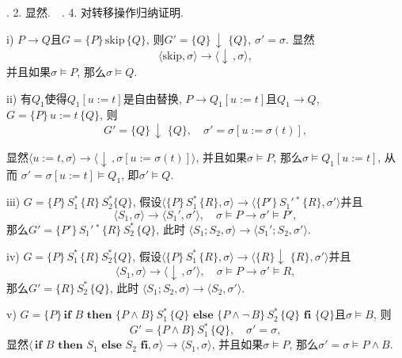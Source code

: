 \documentclass[UTF8]{ctexart}
\begin{document}

\hspace{-0.71em} {. 2.} 显然. \,\, {. 4.} 对转移操作归纳证明.

\hspace{0.5em} i) $P\to Q$且$G=\{P\}\,\mathrm{skip}\,\{Q\}$,
则$G'=\{Q\}\,\downarrow\,\,\{Q\}$, $\sigma'=\sigma$. 显然
\[
    \langle\mathrm{skip},\sigma\rangle\to
    \langle\downarrow\,,\sigma\rangle,
\]
并且如果$\sigma\models P$, 那么$\sigma\models Q$.

\hspace{0.5em} ii) 有$Q_1$使得$Q_1[u:=t]$是自由替换,
$P\to Q_1[u:=t]$且$Q_1\to Q$, $G=\{P\}\,u:=t\,\{Q\}$, 则
\[
    G'=\{Q\}\,\downarrow\,\,\{Q\},\quad\sigma'=\sigma[u:=\sigma(t)],
\]

显然$\langle u:=t,\sigma\rangle\to
\langle\downarrow\,,\sigma[u:=\sigma(t)]\rangle$,
并且如果$\sigma\models P$, 那么$\sigma\models Q_1[u:=t]$, 从而
$\sigma'=\sigma[u:=t]\models Q_1$, 即$\sigma'\models Q$.

\vspace{1pt}
\hspace{0.5em} iii) $G=\{P\}\,S_1^*\,\{R\}\,S_2^*\{Q\}$,
假设$\langle\{P\}\,S_1^*\,\{R\},\sigma\rangle\to
\langle\{P'\}\,S_1'\,^*\,\{R\},\sigma'\rangle$并且
\[
    \langle S_1,\sigma\rangle\to\langle S_1',\sigma'\rangle,\quad
    \sigma\models P\to\sigma'\models P',
\]
那么$G'=\{P'\}\,S_1'\,^*\,\{R\}\,S_2^*\,\{Q\}$, 此时
$\langle S_1;S_2,\sigma\rangle\to\langle S_1';S_2,\sigma'\rangle$.

\hspace{0.5em} iv) $G=\{P\}\,S_1^*\,\{R\}\,S_2^*\{Q\}$,
假设$\langle\{P\}\,S_1^*\,\{R\},\sigma\rangle\to
\langle\{R\}\downarrow\,\,\{R\},\sigma'\rangle$并且
\[
    \langle S_1,\sigma\rangle\to\langle\downarrow\,,\sigma'\rangle,\quad
    \sigma\models P\to\sigma'\models R,
\]
那么$G'=\{R\}\,S_2^*\,\{Q\}$, 此时
$\langle S_1;S_2,\sigma\rangle\to\langle S_2,\sigma'\rangle$.

\vspace{1pt}
\hspace{0.5em} v) $G=\{P\}\,\mathbf{if}\,\,B\,\,\mathbf{then}\,\,
\{P\land B\}\,S_1^*\,\{Q\}\,\,\mathbf{else}\,\,\{P\land\neg\,B\}\,S_2^*
\,\{Q\}\,\,\mathbf{fi}\,\,\{Q\}$且$\sigma\models B$, 则
\[
    G'=\{P\land B\}\,S_1^*\,\{Q\},\quad\sigma'=\sigma,
\]
显然$\langle\,\mathbf{if}\,\,B\,\,\mathbf{then}\,\,S_1\,\,\mathbf{else}\,\,
S_2\,\,\mathbf{fi},\sigma\rangle\to\langle S_1,\sigma\rangle$,
并且如果$\sigma\models P$, 那么$\sigma'=\sigma\models P\land B$.
\end{document}
